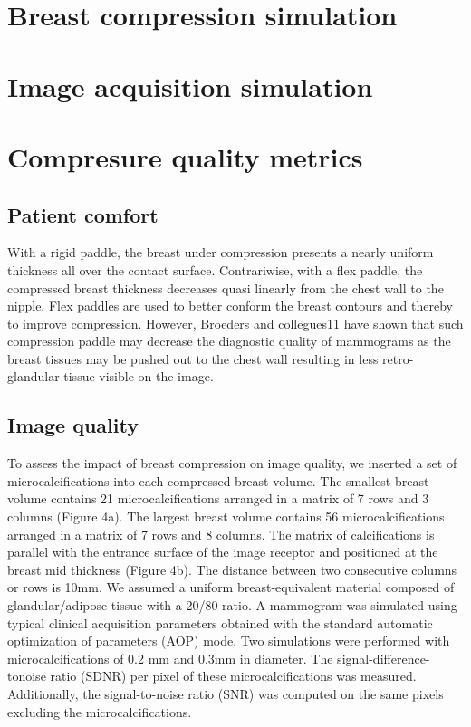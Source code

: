 \section{Breast compression simulation}
\section{Image acquisition simulation }
\section{Compresure quality metrics}\label{section:compressionqualitymetrics}
\subsection{Patient comfort}
With a rigid paddle, the breast under compression presents a nearly uniform thickness all over the contact surface. Contrariwise, with a flex paddle, the compressed breast thickness decreases quasi linearly from the chest wall to the nipple. Flex paddles are used to better conform the breast contours and thereby to improve compression. However, Broeders and collegues11 have shown that such compression paddle may decrease the diagnostic quality of mammograms as the breast tissues may be pushed out to the chest wall resulting in less retro-glandular tissue visible on the image. 

\subsection{Image quality }\label{section:averagegalndulardose}
To assess the impact of breast compression on image quality, we inserted a set of microcalcifications into each compressed breast volume. The smallest breast volume contains 21 microcalcifications arranged in a matrix of 7 rows and 3 columns (Figure 4a). The largest breast volume contains 56 microcalcifications arranged in a matrix of 7 rows and 8 columns. The matrix of calcifications is parallel with the entrance surface of the image receptor and positioned at the breast mid thickness (Figure 4b). The distance between two consecutive columns or rows is 10mm. We assumed a uniform breast-equivalent material composed of glandular/adipose tissue with a 20/80 ratio. A mammogram was simulated using typical clinical acquisition parameters obtained with the standard automatic optimization of parameters (AOP) mode. Two simulations were performed with microcalcifications of 0.2 mm and 0.3mm in diameter. The signal-difference-tonoise ratio (SDNR) per pixel of these microcalcifications was measured. Additionally, the signal-to-noise ratio (SNR) was computed on the same pixels excluding the microcalcifications.  


